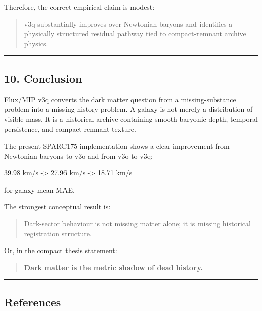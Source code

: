 \documentclass[
]{article}
\newenvironment{Shaded}{}{}
\newcommand{\NormalTok}[1]{#1}
\begin{document}
Therefore, the correct empirical claim is modest:

\begin{quote}
v3q substantially improves over Newtonian baryons and identifies a
physically structured residual pathway tied to compact-remnant archive
physics.
\end{quote}

\begin{center}\rule{0.5\linewidth}{0.5pt}\end{center}

\subsection{10. Conclusion}\label{conclusion}

Flux/MIP v3q converts the dark matter question from a missing-substance
problem into a missing-history problem. A galaxy is not merely a
distribution of visible mass. It is a historical archive containing
smooth baryonic depth, temporal persistence, and compact remnant
texture.

The present SPARC175 implementation shows a clear improvement from
Newtonian baryons to v3o and from v3o to v3q:

\begin{Shaded}
\begin{Highlighting}[]
\NormalTok{39.98 km/s {-}\textgreater{} 27.96 km/s {-}\textgreater{} 18.71 km/s}
\end{Highlighting}
\end{Shaded}

for galaxy-mean MAE.

The strongest conceptual result is:

\begin{quote}
Dark-sector behaviour is not missing matter alone; it is missing
historical registration structure.
\end{quote}

Or, in the compact thesis statement:

\begin{quote}
\textbf{Dark matter is the metric shadow of dead history.}
\end{quote}

\begin{center}\rule{0.5\linewidth}{0.5pt}\end{center}

\subsection{References}\label{references}
\end{document}
